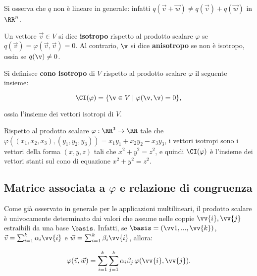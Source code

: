 \begin{remark}
	Si osserva che $q$ non è lineare in generale: infatti $q(\vec{v} + \vec{w}) \neq q(\vec{v}) + q(\vec{w})$ in
	$\RR^n$.
\end{remark}

\begin{definition}
	Un vettore $\vec{v} \in V$ si dice \textbf{isotropo} rispetto al prodotto scalare $\varphi$ se $q(\vec{v}) =
	\varphi(\vec{v}, \vec{v}) = 0$. Al contrario, $\v$ si dice \textbf{anisotropo} se non è isotropo, ossia
	se $q(\v) \neq 0$.
\end{definition}

\begin{definition}
	Si definisce \textbf{cono isotropo} di $V$ rispetto al prodotto scalare $\varphi$ il seguente insieme:
	
	\[ \CI(\varphi) = \{ \v \in V \mid \varphi(\v, \v) = 0 \}, \]
	
	\vskip 0.05in
	
	ossia l'insieme dei vettori isotropi di $V$.
\end{definition}

\begin{example}
	Rispetto al prodotto scalare $\varphi : \RR^3 \to \RR$ tale che $\varphi((x_1, x_2, x_3), (y_1, y_2, y_3)) =
	x_1 y_1 + x_2 y_2 - x_3 y_3$, i vettori isotropi sono i vettori della forma $(x, y, z)$ tali che $x^2 + y^2 = z^2$, e quindi $\CI(\varphi)$ è l'insieme dei
	vettori stanti sul cono di equazione $x^2 + y^2 = z^2$.
\end{example}

\subsection{Matrice associata a \texorpdfstring{$\varphi$}{φ} e relazione di congruenza}

\begin{remark}
	Come già osservato in generale per le applicazioni multilineari, il prodotto scalare è univocamente determinato
	dai valori che assume nelle coppie $\vv{i}, \vv{j}$ estraibili da una base $\basis$. Infatti, se
	$\basis = (\vv1, ..., \vv{k})$, $\vec{v} = \sum_{i=1}^k \alpha_i \vv{i}$ e $\vec{w} = \sum_{i=1}^k \beta_i \vv{i}$,
	allora:
	
	\[ \varphi(\vec{v}, \vec{w}) = \sum_{i=1}^k \sum_{j=1}^k \alpha_i \beta_j \, \varphi(\vv{i}, \vv{j}). \]
\end{remark}

